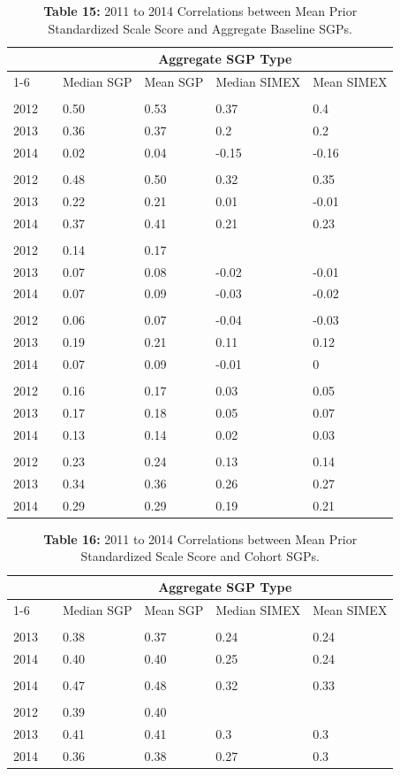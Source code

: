 \documentclass[12pt]{article}
\begin{document}
\begin{table}[H]
\caption*{\textbf{Table 15:} 2011 to 2014 Correlations between Mean Prior Standardized Scale Score and Aggregate Baseline SGPs.\label{table15}} 
\begin{center}
\begin{tabular}{lcllll}
\hline\hline
\multicolumn{1}{c}{\bfseries }&\multicolumn{1}{c}{\bfseries }&\multicolumn{4}{c}{\bfseries Aggregate SGP Type}\tabularnewline
\cline{1-6}
\multicolumn{1}{c}{Year}&\multicolumn{1}{c}{}&\multicolumn{1}{c}{Median SGP}&\multicolumn{1}{c}{Mean SGP}&\multicolumn{1}{c}{Median SIMEX}&\multicolumn{1}{c}{Mean SIMEX}\tabularnewline
\hline
&&&&&\tabularnewline
2012&&0.50&0.53&0.37&0.4\tabularnewline
2013&&0.36&0.37&0.2&0.2\tabularnewline
2014&&0.02&0.04&-0.15&-0.16\tabularnewline
\hline
&&&&&\tabularnewline
2012&&0.48&0.50&0.32&0.35\tabularnewline
2013&&0.22&0.21&0.01&-0.01\tabularnewline
2014&&0.37&0.41&0.21&0.23\tabularnewline
\hline
&&&&&\tabularnewline
2012&&0.14&0.17&&\tabularnewline
2013&&0.07&0.08&-0.02&-0.01\tabularnewline
2014&&0.07&0.09&-0.03&-0.02\tabularnewline
\hline
&&&&&\tabularnewline
2012&&0.06&0.07&-0.04&-0.03\tabularnewline
2013&&0.19&0.21&0.11&0.12\tabularnewline
2014&&0.07&0.09&-0.01&0\tabularnewline
\hline
&&&&&\tabularnewline
2012&&0.16&0.17&0.03&0.05\tabularnewline
2013&&0.17&0.18&0.05&0.07\tabularnewline
2014&&0.13&0.14&0.02&0.03\tabularnewline
\hline
&&&&&\tabularnewline
2012&&0.23&0.24&0.13&0.14\tabularnewline
2013&&0.34&0.36&0.26&0.27\tabularnewline
2014&&0.29&0.29&0.19&0.21\tabularnewline
\hline
\end{tabular}\end{center}

\end{table}

\begin{table}[H]
\caption*{\textbf{Table 16:} 2011 to 2014 Correlations between Mean Prior Standardized Scale Score and Cohort SGPs.\label{table16}} 
\begin{center}
\begin{tabular}{lcllll}
\hline\hline
\multicolumn{1}{c}{\bfseries }&\multicolumn{1}{c}{\bfseries }&\multicolumn{4}{c}{\bfseries Aggregate SGP Type}\tabularnewline
\cline{1-6}
\multicolumn{1}{c}{Year}&\multicolumn{1}{c}{}&\multicolumn{1}{c}{Median SGP}&\multicolumn{1}{c}{Mean SGP}&\multicolumn{1}{c}{Median SIMEX}&\multicolumn{1}{c}{Mean SIMEX}\tabularnewline
\hline
&&&&&\tabularnewline
2013&&0.38&0.37&0.24&0.24\tabularnewline
2014&&0.40&0.40&0.25&0.24\tabularnewline
\hline
&&&&&\tabularnewline
2014&&0.47&0.48&0.32&0.33\tabularnewline
\hline
&&&&&\tabularnewline
2012&&0.39&0.40&&\tabularnewline
2013&&0.41&0.41&0.3&0.3\tabularnewline
2014&&0.36&0.38&0.27&0.3\tabularnewline
\hline
\end{tabular}\end{center}

\end{table}
\end{document}
